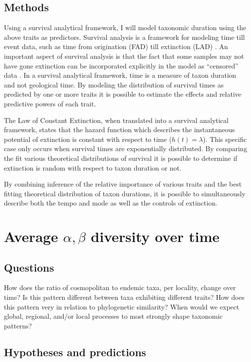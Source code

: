 \documentclass[12pt,letterpaper]{article}
\begin{document}
\subsection{Methods}
Using a survival analytical framework, I will model taxonomic duration using the above traits as predictors. Survival analysis is a framework for modeling time till event data, such as time from origination (FAD) till extinction (LAD) \citep{Kleinbaum2005,Simpson1944,VanValen1973}. An important aspect of survival analysis is that the fact that some samples may not have gone extinction can be incorporated explicitly in the model as ``censored'' data \citep{Kleinbaum2005}. In a survival analytical framework, time is a measure of taxon duration and not geological time. By modeling the distribution of survival times as predicted by one or more traits it is possible to estimate the effects and relative predictive powers of each trait.

The Law of Constant Extinction, when translated into a survival analytical framework, states that the hazard function which describes the instantaneous potential of extinction is constant with respect to time (\(h(t) = \lambda\)). This specific case only occurs when survival times are exponentially distributed. By comparing the fit various theoretical distributions of survival it is possible to determine if extinction is random with respect to taxon duration or not. 

By combining inference of the relative importance of various traits and the best fitting theoretical distribution of taxon durations, it is possible to simultaneously describe both the tempo and mode as well as the controls of extinction.


\section{Average \(\alpha, \beta\) diversity over time}
\subsection{Questions}
How does the ratio of cosmopolitan to endemic taxa, per locality, change over time? Is this pattern different between taxa exhibiting different traits? How does this pattern very in relation to phylogenetic similarity? When would we expect global, regional, and/or local processes to most strongly shape taxonomic patterns?

\subsection{Hypotheses and predictions}
\end{document}
